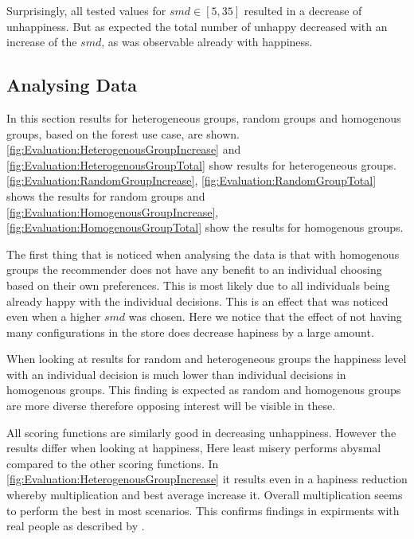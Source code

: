 Surprisingly, all tested values for $smd \in [5,35]$ resulted in a decrease of unhappiness. But as expected the total number of unhappy decreased with an increase of the $smd$, as was observable already with happiness.



\subsection{Analysing Data}

In this section results for heterogeneous groups, random groups and homogenous groups, based on the forest use case, are shown. \autoref{fig:Evaluation:HeterogenousGroupIncrease} and \autoref{fig:Evaluation:HeterogenousGroupTotal} show results for heterogeneous groups. \autoref{fig:Evaluation:RandomGroupIncrease}, \autoref{fig:Evaluation:RandomGroupTotal} shows the results for random groups and \autoref{fig:Evaluation:HomogenousGroupIncrease}, \autoref{fig:Evaluation:HomogenousGroupTotal} show the results for homogenous groups.

The first thing that is noticed when analysing the data is that with homogenous groups the recommender does not have any benefit to an individual choosing based on their own preferences. This is most likely due to all individuals being already happy with the individual decisions. This is an effect that was noticed even when a higher $smd$ was chosen. Here we notice that the effect of not having many configurations in the store does decrease hapiness by a large amount.

When looking at results for random and heterogeneous groups the happiness level with an individual decision is much lower than individual decisions in homogenous groups. This finding is expected as random and homogenous groups are more diverse therefore opposing interest will be visible in these.

All scoring functions are similarly good in decreasing unhappiness. However the results differ when looking at happiness, Here least misery performs abysmal compared to the other scoring functions. In \autoref{fig:Evaluation:HeterogenousGroupIncrease} it results even in a hapiness reduction whereby multiplication and best average increase it. Overall multiplication seems to perform the best in most scenarios. This confirms findings in expirments with real people as described by \citeauthor{Masthoff2015} \cite[p. 755f]{Masthoff2015}.

